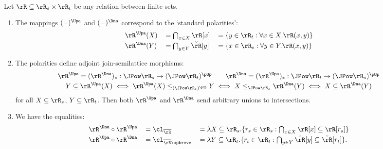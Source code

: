 \documentclass{article}
\begin{document}
  
  \begin{lemma}
  \label{lem:polarities_basic}
  \item
  \label{lem:polar_basic}
  Let $\rR \subseteq \rR_s \times \rR_t$ be any relation between finite sets.
  \begin{enumerate}
  \item
  The mappings $(-)^\Upa$ and $(-)^\Dna$ correspond to the `standard polarities':
  \[
  \begin{tabular}{lll}
  $\rR^\Upa(X)$
  & $= \bigcap_{x \in X} \rR[x]$
  & $= \{ y \in \rR_t : \forall x \in X.\rR(x,y)\}$
  \\[0.5ex]
  $\rR^\Dna(Y)$
  & $= \bigcap_{y \in Y} \breve{\rR}[y]$
  & $= \{ x \in \rR_s : \forall y \in Y.\rR(x,y) \}$
  \end{tabular}
  \]
  \item
  The polarities define adjoint join-semilattice morphisms:
  \[
  \begin{tabular}{c}
  $\rR^\Upa = (\rR^\Dna)_* : \JPow \rR_s \to (\JPow \rR_t)^{\pOp}
  \qquad
  \rR^\Dna = (\rR^\Upa)_* : \JPow \rR_t \to (\JPow \rR_s)^{\pOp}$
  \\[0.5ex]
  $Y \subseteq \rR^\Upa(X) \iff \rR^\Upa (X) \leq_{(\JPow \rR_t)^{\pOp}} Y
  \iff X \leq_{\JPow \rR_s} \rR^\Dna (Y) \iff X \subseteq \rR^\Dna (Y)$
  \end{tabular}
  \]
  for all $X \subseteq \rR_s$, $Y \subseteq \rR_t$. Then both $\rR^\Upa$ and $\rR^\Dna$ send arbitrary unions to intersections.
  
  \item
  We have the equalities:
  \[
  \begin{tabular}{lll}
  $\rR^\Dna \circ \rR^\Upa$
  & $= \cl_{\overline{\rR}}$
  & $= \lambda X \subseteq \rR_s. \{ r_s \in \rR_s : \bigcap_{x \in X} \rR[x] \subseteq \rR[r_s] \}$
  \\[0.5ex]
  $\rR^\Upa \circ \rR^\Dna$
  & $= \cl_{\overline{\rR}\spbreve}$
  & $= \lambda Y \subseteq \rR_t. \{ r_t \in \rR_t : \bigcap_{y \in Y} \breve{\rR}[y] \subseteq \breve{\rR}[r_t] \}$.
  \end{tabular}
  \]
  \end{enumerate}
  \end{lemma}
  
\end{document}
